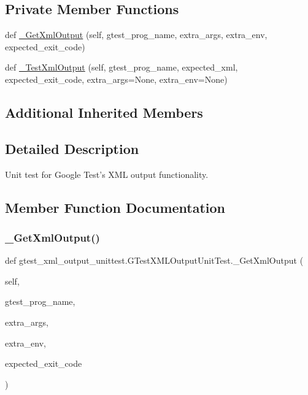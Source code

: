 \subsection*{Private Member Functions}
\begin{DoxyCompactItemize}
\item 
def \mbox{\hyperlink{classgtest__xml__output__unittest_1_1_g_test_x_m_l_output_unit_test_ae57479fcca1861b35c9bcd26d08a18f4}{\+\_\+\+Get\+Xml\+Output}} (self, gtest\+\_\+prog\+\_\+name, extra\+\_\+args, extra\+\_\+env, expected\+\_\+exit\+\_\+code)
\item 
def \mbox{\hyperlink{classgtest__xml__output__unittest_1_1_g_test_x_m_l_output_unit_test_a1d8a5fdd7e602fe31b1477f8ebc1e7f3}{\+\_\+\+Test\+Xml\+Output}} (self, gtest\+\_\+prog\+\_\+name, expected\+\_\+xml, expected\+\_\+exit\+\_\+code, extra\+\_\+args=None, extra\+\_\+env=None)
\end{DoxyCompactItemize}
\subsection*{Additional Inherited Members}


\subsection{Detailed Description}
\begin{DoxyVerb}Unit test for Google Test's XML output functionality.
\end{DoxyVerb}
 

\subsection{Member Function Documentation}
\mbox{\label{classgtest__xml__output__unittest_1_1_g_test_x_m_l_output_unit_test_ae57479fcca1861b35c9bcd26d08a18f4}} 
\subsubsection{\texorpdfstring{\_GetXmlOutput()}{\_GetXmlOutput()}}
{\footnotesize\ttfamily def gtest\+\_\+xml\+\_\+output\+\_\+unittest.\+G\+Test\+X\+M\+L\+Output\+Unit\+Test.\+\_\+\+Get\+Xml\+Output (\begin{DoxyParamCaption}\item[{}]{self,  }\item[{}]{gtest\+\_\+prog\+\_\+name,  }\item[{}]{extra\+\_\+args,  }\item[{}]{extra\+\_\+env,  }\item[{}]{expected\+\_\+exit\+\_\+code }\end{DoxyParamCaption})\hspace{0.3cm}{\ttfamily [private]}}

